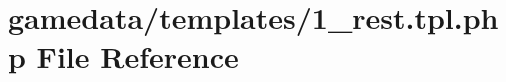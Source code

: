 \hypertarget{1__rest_8tpl_8php}{\section{gamedata/templates/1\+\_\+rest.tpl.\+php File Reference}
\label{1__rest_8tpl_8php}
}
